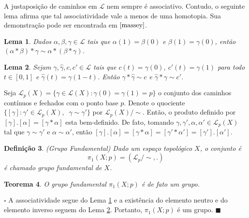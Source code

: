 \documentclass[12pt]{book}
\newtheorem{teorema}{Teorema}[section]
\newtheorem{lema}[teorema]{Lema}
\newtheorem{definicao}[teorema]{Definição}
\newenvironment{prova}[1]{$\square$ #1}{\hfill$\blacksquare$}
\newcommand{\caminhos}{\mathcal{L}}
\newcommand{\caminhospontobase}[1]{\caminhos_{#1}}
\newcommand{\caminhossempontobase}[1]{\caminhos(#1)}
\newcommand{\caminhospontobasegeral}[2]{\caminhos_{#1}(#2)}
\newcommand{\classe}[1]{[#1]}
\newcommand{\grupofundamentalpontobase}[2]{\pi_{1}(#1; #2)}
\newcommand{\intervalo}{[0,1]}
\begin{document}
	A justaposição de caminhos em $\caminhos$ nem sempre é associativo. Contudo, o seguinte lema afirma que tal associatividade vale a menos de uma homotopia. Sua demonstração pode ser encontrada em $\cite{massey}$.
	
	\begin{lema}\label{lema_associatividade_produto_caminhos}
		Dados $\alpha, \beta, \gamma\in \caminhos$ tais que $\alpha(1)=\beta(0)$ e $\beta(1)=\gamma(0)$, então $(\alpha*\beta)*\gamma \sim \alpha*(\beta*\gamma)$.
	\end{lema}
	
	\begin{lema}\label{lema_caminho_inverso}
		Sejam $\gamma, \hat{\gamma} , c,c' \in \caminhos$ tais que $c(t) = \gamma(0)$, $c'(t) = \gamma(1)$ para todo $t\in \intervalo$ e $\hat{\gamma} (t) = \gamma(1-t)$. Então $\gamma*\hat{\gamma}  \sim c$ e $\hat{\gamma}  *\gamma\sim c'$.
	\end{lema} 	
	
	Seja $\caminhospontobasegeral{p}{X} = \{\gamma\in \caminhossempontobase{X}: \gamma(0)=\gamma(1)=p \}$ o conjunto dos caminhos contínuos e fechados com o ponto base $p$. Denote o quociente $\{ \classe{\gamma} : \gamma' \in \caminhospontobasegeral{p}{X},\;\;\gamma \sim \gamma'\}$ por $\caminhospontobasegeral{p}{X}/\sim $. Então, o produto definido por $\classe{\gamma}.\classe{\alpha} = \classe{\gamma*\alpha}$ esta bem-definido. De fato, tomando $\gamma, \gamma',\alpha, \alpha' \in \caminhospontobasegeral{p}{X}$ tal que $\gamma \sim \gamma'$ e $\alpha \sim \alpha'$, então $\classe{\gamma}.\classe{\alpha} = \classe{\gamma*\alpha} = \classe{\gamma'*\alpha'} = \classe{\gamma'}.\classe{\alpha'}$.
	
	\begin{definicao}
		(Grupo Fundamental) Dado um espaço topológico $X$, o conjunto é
		$$
		\grupofundamentalpontobase{X}{p} = (\caminhospontobase{p}/\sim, .)
		$$
		é chamado grupo fundamental de $X$.
	\end{definicao}
	
	\begin{teorema}
		O grupo fundamental $\grupofundamentalpontobase{X}{p}$ é de fato um grupo.
	\end{teorema}
	\begin{prova}
	A associatividade segue do Lema \ref{lema_associatividade_produto_caminhos} e a existência do elemento neutro e do elemento inverso  seguem do Lema \ref{lema_caminho_inverso}. Portanto, $\grupofundamentalpontobase{X}{p}$ é um grupo. 
	\end{prova}
	
\end{document}
